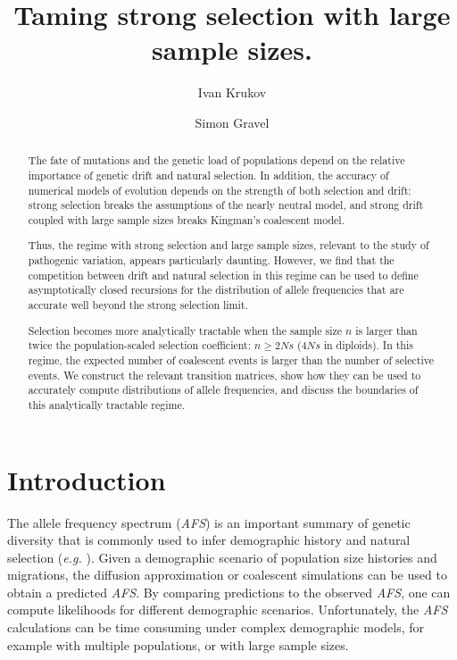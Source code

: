 \documentclass[review,nonatbib]{elsarticle}
\begin{document}
\begin{frontmatter}
  \title{ Taming strong selection with large sample sizes. }

  \author{Ivan Krukov}
  \author{Simon Gravel}

  \begin{abstract}
    The fate of mutations and the genetic load of populations depend on the relative importance of
    genetic drift and natural selection. In addition, the accuracy of numerical models of evolution
    depends on the strength of both selection and drift: strong selection breaks the assumptions of
    the nearly neutral model, and strong drift coupled with large sample sizes breaks
    Kingman's coalescent model.
  
    Thus, the regime with strong selection and large sample sizes, relevant 
    to the study of pathogenic variation, appears particularly daunting.
    However, we find that the competition between drift and natural selection in this regime can be
    used to define asymptotically closed recursions for the distribution of allele
    frequencies that are accurate well beyond the strong selection limit.
 
    Selection becomes more analytically tractable when the sample size $n$ is larger than twice the
    population-scaled selection coefficient: $n \ge 2Ns$ ($4Ns$ in diploids). In this regime, the
    expected number of coalescent events is larger than the number of selective events. 
    We construct the relevant transition matrices, show how they can be used to accurately compute
    distributions of allele frequencies, and discuss the boundaries of this analytically tractable
    regime. 
  \end{abstract}

\end{frontmatter}

\section{Introduction}
\label{sec_introduciton}

The allele frequency spectrum (\textit{AFS}) is an important summary of genetic diversity that is
commonly used to infer demographic history and natural selection (\textit{e.g.}
\cite{GutenkunstEtAl2009, KammEtAl2017, JouganousEtAl2017}). Given a demographic scenario of
population size histories and migrations, the diffusion approximation or coalescent simulations can
be used to obtain a predicted \textit{AFS}. By comparing predictions to the observed \textit{AFS},
one can compute likelihoods for different demographic scenarios. Unfortunately, the \textit{AFS}
calculations can be time consuming under complex demographic models, for example with multiple
populations, or with large sample sizes.
\end{document}
